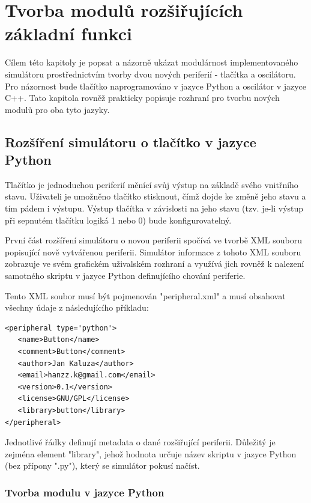 \chapter{Tvorba modulů rozšiřujících základní funkci}
\label{pripad}

Cílem této kapitoly je popsat a názorně ukázat modulárnost implementovaného simulátoru prostřednictvím tvorby dvou nových periferií - tlačítka a oscilátoru. Pro názornost bude tlačítko naprogramováno v jazyce Python a oscilátor v jazyce C++. Tato kapitola rovněž prakticky popisuje rozhraní pro tvorbu nových modulů pro oba tyto jazyky.

\section{Rozšíření simulátoru o tlačítko v jazyce Python}
\label{tlacitko}

Tlačítko je jednoduchou periferií měnící svůj výstup na základě svého vnitřního stavu. Uživateli je umožněno tlačítko stisknout, čímž dojde ke změně jeho stavu a tím pádem i výstupu. Výstup tlačítka v závislosti na jeho stavu (tzv. je-li výstup při sepnutém tlačítku logiká 1 nebo 0) bude konfigurovatelný.

První část rozšíření simulátoru o novou periferii spočívá ve tvorbě XML souboru popisující nově vytvářenou periferii. Simulátor informace z tohoto XML souboru zobrazuje ve svém grafickém uživalském rozhraní a využívá jich rovněž k nalezení samotného skriptu v jazyce Python definujícího chování periferie.

Tento XML soubor musí být pojmenován "peripheral.xml" a musí obsahovat všechny údaje z následujícího příkladu:

\lstset{language=XML, numbers=left, frame=single, breaklines=true, tabsize=2, xleftmargin=20pt}
\begin{lstlisting}
<peripheral type='python'>
   <name>Button</name>
   <comment>Button</comment>
   <author>Jan Kaluza</author>
   <email>hanzz.k@gmail.com</email>
   <version>0.1</version>
   <license>GNU/GPL</license>
   <library>button</library>
</peripheral>
\end{lstlisting}

Jednotlivé řádky definují metadata o dané rozšiřující periferii. Důležitý je zejména element "library", jehož hodnota určuje název skriptu v jazyce Python (bez přípony ".py"), který se simulátor pokusí načíst.

\subsection{Tvorba modulu v jazyce Python}

